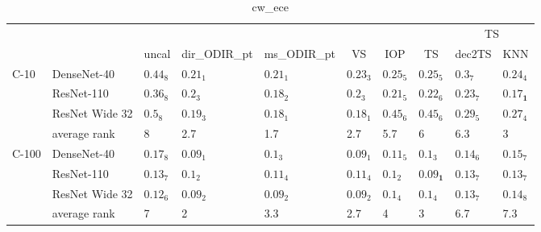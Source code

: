 \begin{table*}
\caption{cw_ece}
\label{table:cw_ece}
\centering
\begin{adjustbox}{width=\textwidth}

\begin{tabular}{llllllllll}
\toprule
\multicolumn{8}{c}{}&\multicolumn{2}{c}{TS}\\
\cmidrule{9-10}
\multicolumn{1}{c}{}&\multicolumn{1}{c}{}&\multicolumn{1}{c}{uncal}&\multicolumn{1}{c}{dir_ODIR_pt}&\multicolumn{1}{c}{ms_ODIR_pt}&\multicolumn{1}{c}{VS}&\multicolumn{1}{c}{IOP}&\multicolumn{1}{c}{TS}&\multicolumn{1}{c}{dec2TS}&\multicolumn{1}{c}{KNN}\\\midrule
C-10 & DenseNet-40 &  $0.44_{8}$ &  $0.21_{1}$ &  $0.21_{1}$ &  $0.23_{3}$ &  $0.25_{5}$ &           $0.25_{5}$ &   $0.3_{7}$ &           $0.24_{4}$ \\
      & ResNet-110 &  $0.36_{8}$ &   $0.2_{3}$ &  $0.18_{2}$ &   $0.2_{3}$ &  $0.21_{5}$ &           $0.22_{6}$ &  $0.23_{7}$ &  $\mathbf{0.17_{1}}$ \\
      & ResNet Wide 32 &   $0.5_{8}$ &  $0.19_{3}$ &  $0.18_{1}$ &  $0.18_{1}$ &  $0.45_{6}$ &           $0.45_{6}$ &  $0.29_{5}$ &           $0.27_{4}$ \\
\cmidrule{2-10}
      & average rank &           8 &         2.7 &         1.7 &         2.7 &         5.7 &                    6 &         6.3 &                    3 \\
\cmidrule{1-10}
C-100 & DenseNet-40 &  $0.17_{8}$ &  $0.09_{1}$ &   $0.1_{3}$ &  $0.09_{1}$ &  $0.11_{5}$ &            $0.1_{3}$ &  $0.14_{6}$ &           $0.15_{7}$ \\
      & ResNet-110 &  $0.13_{7}$ &   $0.1_{2}$ &  $0.11_{4}$ &  $0.11_{4}$ &   $0.1_{2}$ &  $\mathbf{0.09_{1}}$ &  $0.13_{7}$ &           $0.13_{7}$ \\
      & ResNet Wide 32 &  $0.12_{6}$ &  $0.09_{2}$ &  $0.09_{2}$ &  $0.09_{2}$ &   $0.1_{4}$ &            $0.1_{4}$ &  $0.13_{7}$ &           $0.14_{8}$ \\
\cmidrule{2-10}
      & average rank &           7 &           2 &         3.3 &         2.7 &           4 &                    3 &         6.7 &                  7.3 \\
\bottomrule
\end{tabular}


\end{adjustbox}
\end{table*}